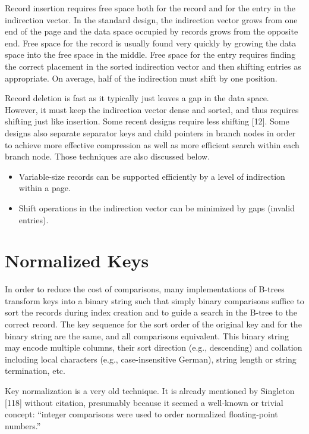 Record insertion requires free space both for the record and for the
entry in the indirection vector. In the standard design, the indirection
vector grows from one end of the page and the data space occupied by
records grows from the opposite end. Free space for the record is
usually found very quickly by growing the data space into the free space
in the middle. Free space for the entry requires finding the correct
placement in the sorted indirection vector and then shifting entries as
appropriate. On average, half of the indirection must shift by one
position.

Record deletion is fast as it typically just leaves a gap in the data
space. However, it must keep the indirection vector dense and sorted,
and thus requires shifting just like insertion. Some recent designs
require less shifting {[}12{]}. Some designs also separate separator
keys and child pointers in branch nodes in order to achieve more
effective compression as well as more efficient search within each
branch node. Those techniques are also discussed below.

\begin{itemize}
\item
  Variable-size records can be supported efficiently by a level of
  indirection within a page.
\item
  Shift operations in the indirection vector can be minimized by gaps
  (invalid entries).
\end{itemize}

\hypertarget{normalized-keys}{%
\section{Normalized Keys}\label{normalized-keys}}

In order to reduce the cost of comparisons, many implementations of
B-trees transform keys into a binary string such that simply binary
comparisons suffice to sort the records during index creation and to
guide a search in the B-tree to the correct record. The key sequence for
the sort order of the original key and for the binary string are the
same, and all comparisons equivalent. This binary string may encode
multiple columns, their sort direction (e.g., descending) and collation
including local characters (e.g., case-insensitive German), string
length or string termination, etc.

Key normalization is a very old technique. It is already mentioned by
Singleton {[}118{]} without citation, presumably because it seemed a
well-known or trivial concept: ``integer comparisons were used to order
normalized floating-point numbers.''

